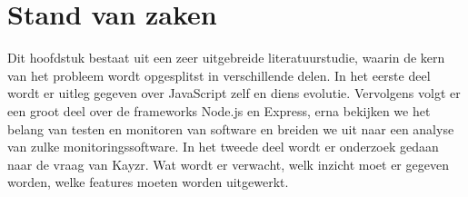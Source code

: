 \chapter{Stand van zaken}
\label{ch:stand-van-zaken}


%
%
%


Dit hoofdstuk bestaat uit een zeer uitgebreide literatuurstudie, waarin de kern van het probleem wordt opgesplitst in verschillende delen. In het eerste deel wordt er uitleg gegeven over JavaScript zelf en diens evolutie. Vervolgens volgt er een groot deel over de frameworks Node.js en Express, erna bekijken we het belang van testen en monitoren van software en breiden we uit naar een analyse van zulke monitoringssoftware. In het tweede deel wordt er onderzoek gedaan naar de vraag van Kayzr. Wat wordt er verwacht, welk inzicht moet er gegeven worden, welke features moeten worden uitgewerkt. 

